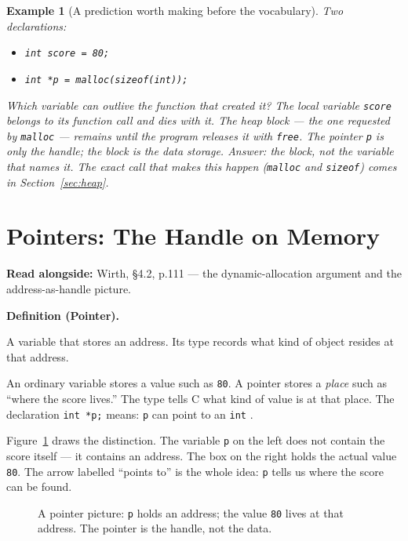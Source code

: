 \documentclass[11pt]{article}
\newtheorem{example}{Example}[section]
\newenvironment{definitionbox}[1]{%
  \par\noindent\textbf{Definition (#1).}\ \itshape
}{\par\vspace{0.3em}}
\begin{document}
\begin{example}[A prediction worth making before the vocabulary]
Two declarations:
\begin{itemize}
  \item \texttt{int score = 80;}
  \item \texttt{int *p = malloc(sizeof(int));}
\end{itemize}
Which variable can outlive the function that created it? The local variable
\texttt{score} belongs to its function call and dies with it. The heap block ---
the one requested by \texttt{malloc} --- remains until the program releases it
with \texttt{free}. The pointer \texttt{p} is only the \emph{handle}; the block
is the data storage. Answer: the \emph{block}, not the variable that names it.
The exact call that makes this happen (\texttt{malloc} and \texttt{sizeof}) comes
in Section~\ref{sec:heap}.
\end{example}

\section{Pointers: The Handle on Memory}

\textbf{Read alongside:} Wirth, \S4.2, p.111 --- the dynamic-allocation argument and the address-as-handle picture.

\begin{definitionbox}{Pointer}
A variable that stores an address. Its type records what kind of object resides
at that address.
\end{definitionbox}

An ordinary variable stores a value such as \texttt{80}. A pointer stores a
\emph{place} such as ``where the score lives.'' The type tells C what kind of
value is at that place. The declaration \texttt{int *p;} means: \texttt{p} can
point to an \texttt{int} \cite{Wirth2004_algorithms_data_structures}.

Figure~\ref{fig:pointer-picture} draws the distinction. The variable \texttt{p}
on the left does not contain the score itself --- it contains an address. The box
on the right holds the actual value \texttt{80}. The arrow labelled ``points
to'' is the whole idea: \texttt{p} tells us where the score can be found.

\begin{figure}[h]
  \centering
  \caption{A pointer picture: \texttt{p} holds an address; the value \texttt{80}
  lives at that address. The pointer is the handle, not the data.}
  \label{fig:pointer-picture}
\end{figure}
\end{document}
